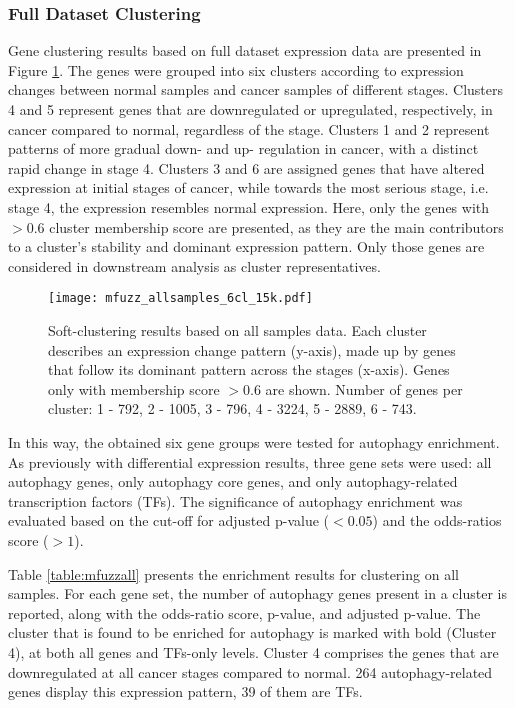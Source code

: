     
   
    \subsubsection{Full Dataset Clustering}
     Gene clustering results based on full dataset expression data are presented in Figure \ref{fig:mfuzzall}. The genes were grouped into six clusters according to expression changes between normal samples and cancer samples of different stages. 
     Clusters 4 and 5 represent genes that are downregulated or upregulated, respectively, in cancer compared to normal, regardless of the stage. Clusters 1 and 2 represent patterns of more gradual down- and up- regulation in cancer, with a distinct rapid change in stage 4. Clusters 3 and 6 are assigned genes that have altered expression at initial stages of cancer, while towards the most serious stage, i.e. stage 4, the expression resembles normal expression. 
     Here, only the genes with $>0.6$ cluster membership score are presented, as they are the main contributors to a cluster's stability and dominant expression pattern. Only those genes are considered in downstream analysis as cluster representatives. 

        
            \begin{figure}[!h]
            \centering
            \texttt{[image: mfuzz\_allsamples\_6cl\_15k.pdf]} 
            \caption[Soft-clustering results for all samples gene expression]{Soft-clustering results based on all samples data. Each cluster describes an expression change pattern (y-axis), made up by genes that follow its dominant pattern across the stages (x-axis). Genes only with membership score $>0.6$ are shown. Number of genes per cluster: 1 - 792, 2 - 1005, 3 - 796, 4 - 3224, 5 - 2889, 6 - 743.}
            \label{fig:mfuzzall}
            \end{figure}
            
        In this way, the obtained six gene groups were tested for autophagy enrichment. As previously with differential expression results, three gene sets were used: all autophagy genes, only autophagy core genes, and only autophagy-related transcription factors (TFs). The significance of autophagy enrichment was evaluated based on the cut-off for adjusted p-value ($<0.05$) and the odds-ratios score ($>1$).
        
        Table \ref{table:mfuzzall} presents the enrichment results for clustering on all samples. For each gene set, the number of autophagy genes present in a cluster is reported, along with the odds-ratio score, p-value, and adjusted p-value. The cluster that is found to be enriched for autophagy is marked with bold (Cluster 4), at both all genes and TFs-only levels. Cluster 4 comprises the genes that are downregulated at all cancer stages compared to normal. 264 autophagy-related genes display this expression pattern, 39 of them are TFs.
    

